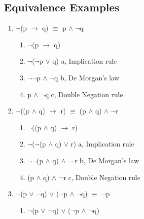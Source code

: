 \documentclass{report}
\begin{document}
\subsection{Equivalence Examples}

\begin{enumerate}



  \item $\neg$(p $\to$ q) $\equiv$ p $\land$ $\neg$q

  \begin{enumerate}

    \item $\neg$(p $\to$ q)

    \item $\neg$($\neg$p $\lor$ q) \hfill a, Implication rule

    \item $\neg$$\neg$p $\land$ $\neg$q \hfill b, De Morgan's law

    \item p $\land$ $\neg$q \hfill c, Double Negation rule

  \end{enumerate}

  

  \item $\neg$((p $\land$ q) $\to$ r) $\equiv$ (p $\land$ q) $\land$ $\neg$r

  \begin{enumerate}

    \item $\neg$((p $\land$ q) $\to$ r)

    \item $\neg$($\neg$(p $\land$ q) $\lor$ r) \hfill a, Implication rule

    \item $\neg$$\neg$(p $\land$ q) $\land$ $\neg$ r \hfill b, De Morgan's law

    \item (p $\land$ q) $\land$ $\neg$r \hfill c, Double Negation rule

  \end{enumerate}



  \item $\neg$(p $\lor$ $\neg$q) $\lor$ ($\neg$p $\land$ $\neg$q) $\equiv$ $\neg$p

  \begin{enumerate}

    \item $\neg$(p $\lor$ $\neg$q) $\lor$ ($\neg$p $\land$ $\neg$q)


\end{enumerate}
\end{enumerate}
\end{document}
